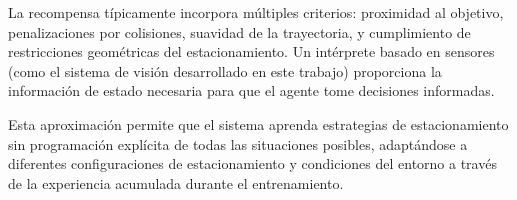\noindent
La recompensa típicamente incorpora múltiples criterios: proximidad al objetivo, penalizaciones por colisiones,
suavidad de la trayectoria, y cumplimiento de restricciones geométricas del estacionamiento.
Un intérprete basado en sensores (como el sistema de visión desarrollado en este trabajo) proporciona
la información de estado necesaria para que el agente tome decisiones informadas.

\noindent
Esta aproximación permite que el sistema aprenda estrategias de estacionamiento sin programación explícita
de todas las situaciones posibles, adaptándose a diferentes configuraciones de estacionamiento y
condiciones del entorno a través de la experiencia acumulada durante el entrenamiento.
